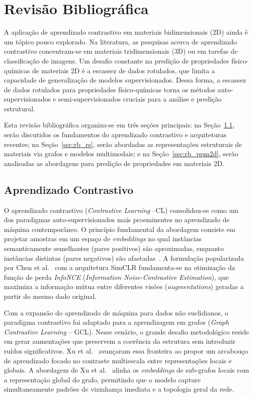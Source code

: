 \chapter{Revisão Bibliográfica}

A aplicação de aprendizado contrastivo em materiais bidimensionais (2D) ainda é um tópico pouco explorado. Na literatura, as pesquisas acerca de aprendizado contrastivo concentram-se em materiais tridimensionais (3D) ou em tarefas de classificação de imagens.
Um desafio constante na predição de propriedades físico-químicas de materiais 2D é a escassez de dados rotulados, que limita a capacidade de generalização de modelos supervisionados.  
Dessa forma, a escassez de dados rotulados para propriedades físico-químicas torna os métodos auto-supervisionados e semi-supervisionados cruciais para a análise e predição estrutural\cite{langer2022representations}. 

Esta revisão bibliográfica organiza-se em três seções principais: na Seção~\ref{sec:rb_cl}, serão discutidos os fundamentos do aprendizado contrastivo e arquiteturas recentes; na Seção~\ref{sec:rb_rs}, serão abordadas as representações estruturais de materiais via grafos e modelos multimodais; e na Seção~\ref{sec:rb_ppm2d}, serão analisadas as abordagens para predição de propriedades em materiais 2D.

\section{Aprendizado Contrastivo} \label{sec:rb_cl}

O aprendizado contrastivo (\textit{Contrastive Learning} --CL) consolidou-se como um dos paradigmas auto-supervisionados mais proeminentes no aprendizado de máquina contemporâneo. O princípio fundamental da abordagem consiste em projetar amostras em um espaço de \textit{embeddings} no qual instâncias semanticamente semelhantes (pares positivos) são aproximadas, enquanto instâncias distintas (pares negativos) são afastadas~\cite{chen2020simple}. A formulação popularizada por Chen et al.~\cite{chen2020simple} com a arquitetura SimCLR fundamenta-se na otimização da função de perda \textit{InfoNCE} (\textit{Information Noise-Contrastive Estimation}), que maximiza a informação mútua entre diferentes visões (\textit{augmentations}) geradas a partir do mesmo dado original.

Com a expansão do aprendizado de máquina para dados não euclidianos, o paradigma contrastivo foi adaptado para a aprendizagem em grafos (\textit{Graph Contrastive Learning} -- GCL). Nesse cenário, o grande desafio metodológico reside em gerar aumentações que preservem a coerência da estrutura sem introduzir ruídos significativos. Xu et al.~\cite{xu2021self} avançaram essa fronteira ao propor um arcabouço de aprendizado focado no contraste multiescala entre representações locais e globais. A abordagem de Xu et al.~\cite{xu2021self} alinha os \textit{embeddings} de sub-grafos locais com a representação global do grafo, permitindo que o modelo capture simultaneamente padrões de vizinhança imediata e a topologia geral da rede.

